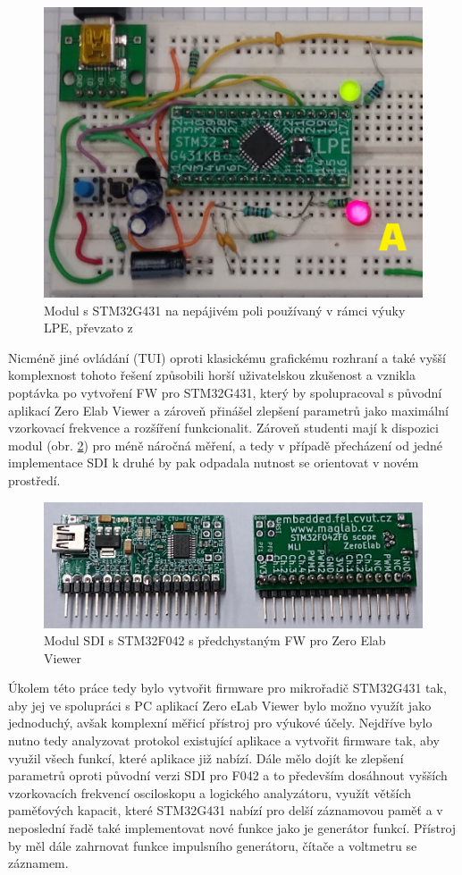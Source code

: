 \begin{figure}[H]
	\centering
	\includegraphics[width=0.5\linewidth]{Figs/Documentation/G431breadboard}
	\caption{Modul s STM32G431 na nepájivém poli používaný v rámci výuky LPE, převzato z \cite{LPE}}
	\label{fig:g431breadboard}
\end{figure}

Nicméně jiné ovládání (TUI) oproti klasickému grafickému rozhraní a také vyšší komplexnost tohoto řešení způsobili horší uživatelskou zkušenost a vznikla poptávka po vytvoření FW pro STM32G431, který by spolupracoval s původní aplikací Zero Elab Viewer a zároveň přinášel zlepšení parametrů jako maximální vzorkovací frekvence a rozšíření funkcionalit. Zároveň studenti mají k dispozici modul (obr. \ref{fig:modulef042}) pro méně náročná měření, a tedy v případě přecházení od jedné implementace SDI k druhé by pak odpadala nutnost se orientovat v novém prostředí. 
\begin{figure}[H]
	\centering
	\includegraphics[width=0.7\linewidth]{Figs/Documentation/module_F042}
	\caption{Modul SDI s STM32F042 s předchystaným FW pro Zero Elab Viewer    }
	\label{fig:modulef042}
\end{figure}
Úkolem této práce tedy bylo vytvořit firmware pro mikrořadič STM32G431 tak, aby jej ve spolupráci
s PC aplikací Zero eLab Viewer bylo možno využít jako jednoduchý, avšak komplexní měřicí přístroj pro výukové účely. Nejdříve bylo nutno tedy analyzovat protokol existující aplikace a vytvořit firmware tak, aby využil všech funkcí, které aplikace již nabízí. Dále mělo dojít ke zlepšení parametrů oproti původní verzi SDI pro F042 a to především dosáhnout vyšších vzorkovacích frekvencí osciloskopu a logického analyzátoru, využít větších paměťových kapacit, které STM32G431 nabízí pro  delší záznamovou paměť a v neposlední řadě také implementovat nové funkce jako je generátor funkcí. Přístroj by měl dále zahrnovat funkce impulsního generátoru, čítače a voltmetru se záznamem.
